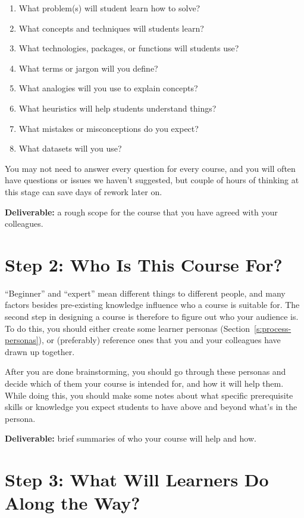 \begin{enumerate}
\item
  What problem(s) will student learn how to solve?
\item
  What concepts and techniques will students learn?
\item
  What technologies, packages, or functions will students use?
\item
  What terms or jargon will you define?
\item
  What analogies will you use to explain concepts?
\item
  What heuristics will help students understand things?
\item
  What mistakes or misconceptions do you expect?
\item
  What datasets will you use?
\end{enumerate}

You may not need to answer every question for every course, and you will
often have questions or issues we haven't suggested, but couple of hours
of thinking at this stage can save days of rework later on.

\textbf{Deliverable:} a rough scope for the course that you have agreed with
your colleagues.

\section{Step 2: Who Is This Course For?}\label{step-2-who-is-this-course-for}

``Beginner'' and ``expert'' mean different things to different people, and
many factors besides pre-existing knowledge influence who a course is
suitable for. The second step in designing a course is therefore to
figure out who your audience is. To do this, you should either create
some learner personas (Section~\ref{s:process-personas}), or (preferably)
reference ones that you and your colleagues have drawn up together.

After you are done brainstorming, you should go through these personas
and decide which of them your course is intended for, and how it will
help them. While doing this, you should make some notes about what
specific prerequisite skills or knowledge you expect students to have
above and beyond what's in the persona.

\textbf{Deliverable:} brief summaries of who your course will help and how.

\section{Step 3: What Will Learners Do Along the Way?}\label{step-3-what-will-learners-do-along-the-way}

